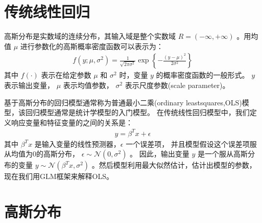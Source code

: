 \documentclass[letterpaper,10pt,english]{sphinxmanual}
\begin{document}
\section{传统线性回归}
\label{\detokenize{_u9ad8_u65af_u6a21_u578b/content:id2}}
高斯分布是实数域的连续分布，其输入域是整个实数域 \(R=(-\infty,+\infty)\)
。用均值 \(\mu\) 进行参数化的高斯概率密度函数可以表示为：
\begin{equation}\label{equation:高斯模型/content:高斯模型/content:0}
\begin{split}f(y;\mu,\sigma^2)=\frac{1}{\sqrt{2\pi \sigma^2}} \exp \left \{ - \frac{(y-\mu)^2}{2\sigma^2} \right \}\end{split}
\end{equation}
其中 \(f(\cdot)\) 表示在给定参数 \(\mu\) 和 \(\sigma^2\) 时，变量 \(y\) 的概率密度函数的一般形式。
\(y\) 表示输出变量， \(\mu\) 表示均值参数， \(\sigma^2\) 表示尺度参数(scale parameter)。

基于高斯分布的回归模型通常称为普通最小二乘(ordinary least\sphinxhyphen{}squares,OLS)模型，该回归模型通常是统计学模型的入门模型。
在传统线性回归模型中，我们定义响应变量和特征变量的之间的关系是：
\begin{equation}\label{equation:高斯模型/content:高斯模型/content:1}
\begin{split}y = \beta^T x + \epsilon\end{split}
\end{equation}
其中 \(\beta^T x\) 是输入变量的线性预测器，\(\epsilon\) 一个误差项，
并且模型假设这个误差项服从均值为0的高斯分布，
\(\epsilon \sim \mathcal{N}(0,\sigma^2)\) 。
因此，输出变量 \(y\) 是一个服从高斯分布的变量 \(y \sim \mathcal{N}(\beta^Tx,\sigma^2)\)
。然后模型利用最大似然估计，估计出模型的参数，现在我们用GLM框架来解释OLS。


\section{高斯分布}
\label{\detokenize{_u9ad8_u65af_u6a21_u578b/content:id3}}
\end{document}

